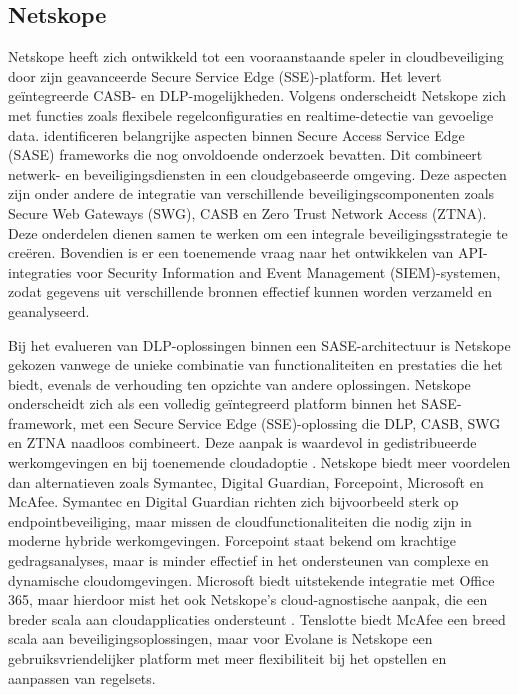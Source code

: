 \subsection{Netskope}%

Netskope heeft zich ontwikkeld tot een vooraanstaande speler in cloudbeveiliging door zijn geavanceerde Secure Service Edge (SSE)-platform. 
Het levert geïntegreerde CASB- en DLP-mogelijk\-heden. 
Volgens \textcite{Riley2018} onderscheidt Netskope zich met functies zoals flexibele regelconfiguraties en realtime-detectie van gevoelige data. 
\textcite{VanDerWalt2022} identificeren belangrijke aspecten binnen Secure Access Service Edge (SASE) frameworks die nog onvoldoende onderzoek bevatten. 
Dit combineert netwerk- en beveiligingsdiensten in een cloudgebaseerde omgeving. 
Deze aspecten zijn onder andere de integratie van verschillende beveiligingscomponenten zoals Secure Web Gateways (SWG), CASB en Zero Trust Network Access (ZTNA). 
Deze onderdelen dienen samen te werken om een integrale beveiligingsstrategie te creëren. 
Bovendien is er een toenemende vraag naar het ontwikkelen van API-integraties voor Security Information and Event Management (SIEM)-systemen, 
zodat gegevens uit verschillende bronnen effectief kunnen worden verzameld en geanalyseerd.

Bij het evalueren van DLP-oplossingen binnen een SASE-architectuur is Netskope gekozen vanwege de unieke combinatie van functionaliteiten en prestaties die het biedt, 
evenals de verhouding ten opzichte van andere oplossingen. 
Netskope onderscheidt zich als een volledig geïntegreerd platform binnen het SASE-framework, met een Secure Service Edge (SSE)-oplossing die DLP, CASB, SWG en ZTNA naadloos combineert. 
Deze aanpak is waardevol in gedistribueerde werkomgevingen en bij toenemende cloudadoptie \autocite{brouwer2021cloud}. 
Netskope biedt meer voordelen dan alternatieven zoals Symantec, Digital Guardian, Forcepoint, Microsoft en McAfee. 
Symantec en Digital Guardian richten zich bijvoorbeeld sterk op endpointbeveiliging, maar missen de cloudfunctionaliteiten die nodig zijn in moderne hybride werkomgevingen. 
Forcepoint staat bekend om krachtige gedragsanalyses, maar is minder effectief in het ondersteunen van complexe en dynamische cloudomgevingen. 
Microsoft biedt uitstekende integratie met Office 365, maar hierdoor mist het ook Netskope's cloud-agnostische aanpak, die een breder scala aan cloudapplicaties ondersteunt \autocite{NetskopeTAP2024}. 
Tenslotte biedt McAfee een breed scala aan beveiligingsoplossingen, maar voor Evolane is Netskope een gebruiksvriendelijker platform met meer flexibiliteit bij het opstellen en aanpassen van regelsets.

